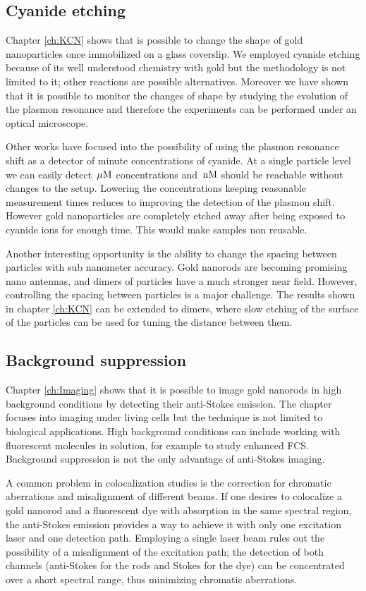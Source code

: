\subsection{Cyanide etching}
Chapter \ref{ch:KCN} shows that is possible to change the shape of gold
nanoparticles once immobilized on a glass coverslip. We employed cyanide etching
because of its well understood chemistry with gold but the methodology is not
limited to it; other reactions are possible alternatives. Moreover we have shown
that it is possible to monitor the changes of shape by studying the evolution of
the plasmon resonance and therefore the experiments can be performed under an
optical microscope. 

Other works have focused into the possibility of using the plasmon resonance
shift as a detector of minute concentrations of cyanide\cite{Wei2012}.
At a single particle level we can easily detect $\,\mu\textrm{M}$ concentrations and $\,\textrm{nM}$
should be reachable without changes to the setup. Lowering the concentrations
keeping reasonable measurement times reduces to improving the detection of the
plasmon shift. However gold nanoparticles are completely etched away after being
exposed to cyanide ions for enough time. This would make samples non reusable.

Another interesting opportunity is the ability to change the spacing between
particles with sub nanometer accuracy\cite{Funston2009}. Gold nanorods are
becoming promising nano antennas, and dimers of particles have a much stronger
near field. However, controlling the spacing between particles is a major
challenge. The results shown in chapter \ref{ch:KCN} can be extended to dimers,
where slow etching of the surface of the particles can be used for tuning the
distance between them.

\subsection{Background suppression}
Chapter \ref{ch:Imaging} shows that it is possible to image gold nanorods in
high background conditions by detecting their anti-Stokes emission. The chapter
focuses into imaging under living cells but the technique is not limited to
biological applications. High background conditions can include working with
fluorescent molecules in solution, for example to study enhanced
FCS\cite{Langguth2014}. Background suppression is not the only advantage of
anti-Stokes imaging.

A common problem in colocalization studies is the correction for chromatic
aberrations and misalignment of different beams. If one desires to colocalize a
gold nanorod and a fluorescent dye with absorption in the same spectral region,
the anti-Stokes emission provides a way to achieve it with only one excitation
laser and one detection path. Employing a single laser beam rules out the
possibility of a misalignment of the excitation path; the detection of both
channels (anti-Stokes for the rods and Stokes for the dye) can be concentrated
over a short spectral range, thus minimizing chromatic aberrations.

